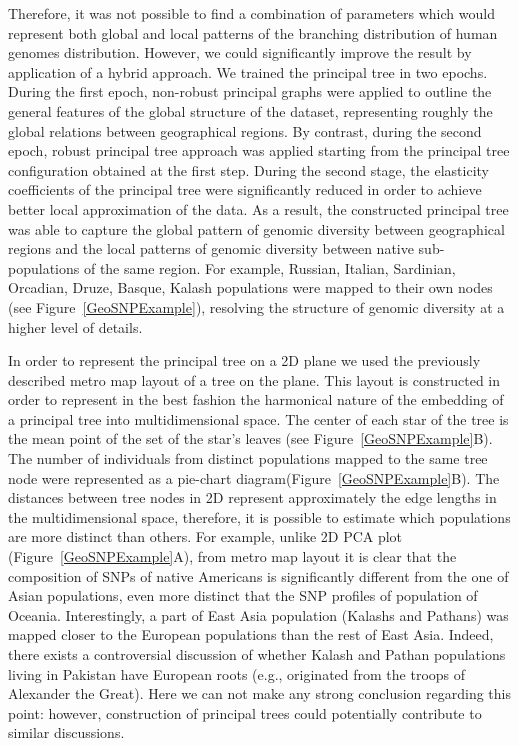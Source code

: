 \documentclass[graybox]{archivesofdatascience}
\begin{document}
Therefore, it was not possible to find a combination of parameters which would represent both global and local patterns of the branching distribution of human genomes distribution. 
However, we could significantly improve the result by application of a hybrid approach. 
We trained the principal tree in two epochs. During the first epoch,  non-robust principal graphs were applied to outline the general features of the global structure of the dataset, representing roughly the global relations between geographical regions. 
By contrast, during the second epoch, robust principal tree approach was applied starting from the principal tree configuration obtained at the first step. 
During the second stage, the elasticity coefficients of the principal tree were significantly reduced in order to achieve better local approximation of the data. 
As a result, the constructed principal tree was able to capture the global pattern of genomic diversity between geographical regions and the local patterns of genomic diversity between native sub-populations of the same region. 
For example, Russian, Italian, Sardinian, Orcadian, Druze, Basque, Kalash populations were mapped to their own nodes (see Figure~\ref{GeoSNPExample}), resolving the structure of genomic diversity at a higher level of details.

In order to represent the principal tree on a 2D plane we used the previously described metro map layout of a tree on the plane\citep{gorban2008beyond,GorbanPMaGiP}. This layout is constructed in order to represent in the best fashion the harmonical nature of the embedding of a principal tree into multidimensional space. 
The center of each star of the tree is the mean point of the set of the star's leaves (see Figure~\ref{GeoSNPExample}B). 
The number of individuals from distinct populations mapped to the same tree node were represented as a pie-chart diagram(Figure~\ref{GeoSNPExample}B).
The distances between tree nodes in 2D represent approximately the edge lengths in the multidimensional space, 
therefore, it is possible to estimate which populations are more distinct than others. 
For example, unlike 2D PCA plot (Figure~\ref{GeoSNPExample}A), from metro map layout it is clear that the composition of SNPs of native Americans is significantly different 
from the one of Asian populations, even more distinct that the SNP profiles of population of Oceania. 
Interestingly, a part of East Asia population (Kalashs and Pathans) was mapped closer to the European populations than the rest of East Asia. 
Indeed, there exists a controversial discussion of whether Kalash and Pathan populations living in Pakistan have European roots 
(e.g., originated from the troops of Alexander the Great)\citep{Firasat2007,wood2001footsteps}. 
Here we can not make any strong conclusion regarding this point: however, construction of principal trees could potentially contribute to similar discussions.
\end{document}

